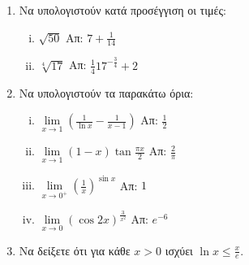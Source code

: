 


\everymath{\displaystyle}



\begin{center}
\end{center}


\vspace{\baselineskip}

\begin{enumerate}
  \item Να υπολογιστούν κατά προσέγγιση οι τιμές:
  \begin{enumerate}[i)]
    \item $\sqrt{50}$ \hfill Απ: $7+\frac{1}{14}$
    \item $\sqrt[4]{17}$ \hfill Απ: $\frac{1}{4}17^{-\frac{3}{4}}+2$
  \end{enumerate}

  \item Να υπολογιστούν τα παρακάτω όρια:
  \begin{enumerate}[i)]
    \item $\lim\limits_{x\to 1}\left(\frac{1}{\ln x}-\frac{1}{x-1}\right)$ \hfill Απ: $\frac{1}{2}$
    \item $\lim\limits_{x\to 1}(1-x)\tan \frac{\pi x}{2}$ \hfill Απ: $\frac{2}{\pi}$
    \item $\lim\limits_{x\to 0^{+}}\left(\frac{1}{x}\right)^{\sin x}$ \hfill Απ: $1$
    \item $\lim\limits_{x\to 0}(\cos 2x)^{\frac{3}{x^{2}}}$ \hfill Απ: $e^{-6}$
  \end{enumerate}

  \item Να δείξετε ότι για κάθε $x>0$ ισχύει $\ln x\leq \frac{x}{e}$. 
\end{enumerate}


